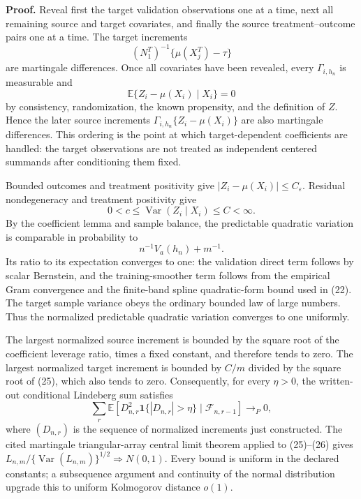 \textbf{Proof.}
Reveal first the target validation observations one at a time, next all remaining source and target covariates, and finally the source treatment--outcome pairs one at a time.  The target increments
\[
 (N^T_1)^{-1}\{\mu(X_j^T)-\tau\}
\]
are martingale differences.  Once all covariates have been revealed, every \(\Gamma_{i,h_n}\) is measurable and
\[
 \mathbb E\{Z_i-\mu(X_i)\mid X_i\}=0
\tag{23}
\]
by consistency, randomization, the known propensity, and the definition of \(Z\).  Hence the later source increments \(\Gamma_{i,h_n}\{Z_i-\mu(X_i)\}\) are also martingale differences.  This ordering is the point at which target-dependent coefficients are handled: the target observations are not treated as independent centered summands after conditioning them fixed.

Bounded outcomes and treatment positivity give \(|Z_i-\mu(X_i)|\le C_\varepsilon\).  Residual nondegeneracy and treatment positivity give
\[
 0<c\le\operatorname{Var}(Z_i\mid X_i)\le C<\infty.
\tag{24}
\]
By the coefficient lemma and sample balance, the predictable quadratic variation is comparable in probability to
\[
 n^{-1}V_a(h_n)+m^{-1}.
\tag{25}
\]
Its ratio to its expectation converges to one: the validation direct term follows by scalar Bernstein, and the training-smoother term follows from the empirical Gram convergence and the finite-band spline quadratic-form bound used in (22).  The target sample variance obeys the ordinary bounded law of large numbers.  Thus the normalized predictable quadratic variation converges to one uniformly.

The largest normalized source increment is bounded by the square root of the coefficient leverage ratio, times a fixed constant, and therefore tends to zero.  The largest normalized target increment is bounded by \(C/m\) divided by the square root of (25), which also tends to zero.  Consequently, for every \(\eta>0\), the written-out conditional Lindeberg sum satisfies
\[
 \sum_r\mathbb E\left[
 D_{n,r}^2\mathbf1\{|D_{n,r}|>\eta\}
 \mid\mathcal F_{n,r-1}\right]\longrightarrow_P0,
\tag{26}
\]
where \((D_{n,r})\) is the sequence of normalized increments just constructed.  The cited martingale triangular-array central limit theorem applied to (25)--(26) gives \(L_{n,m}/\{\operatorname{Var}(L_{n,m})\}^{1/2}\Rightarrow N(0,1)\).  Every bound is uniform in the declared constants; a subsequence argument and continuity of the normal distribution upgrade this to uniform Kolmogorov distance \(o(1)\).

